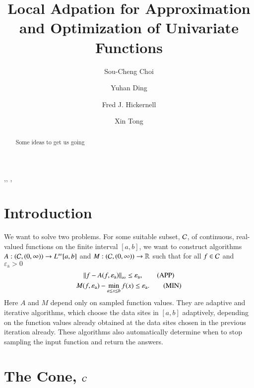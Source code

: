 \documentclass[review]{elsarticle}
\newcommand{\abstol}{\varepsilon_{\textrm{a}}}
\theoremstyle{definition}
\begin{document}
\begin{frontmatter}

\title{Local Adpation for Approximation and Optimization of Univariate Functions}


\author{Sou-Cheng Choi}
\author{Yuhan Ding}
\author{Fred J. Hickernell}
\author{Xin Tong}
\address{Department of Applied Mathematics, Illinois Institute of Technology, RE 208, 10 West 32$^{\text{nd}}$ Street, Chicago, Illinois, 60616, USA}

\begin{abstract}
Some ideas to get us going
\end{abstract}

\begin{keyword}
\sep \sep
\MSC[2010]  \sep
\end{keyword}

\end{frontmatter}

\section{Introduction} \label{sec:intro}

We want to solve two problems. For some suitable subset, $\mathcal{C}$, of continuous,
real-valued functions on the finite interval $[a,b]$, we want to construct
algorithms $A:(\mathcal{C},(0,\infty)) \to L^{\infty}[a,b]$ and $M: (\mathcal{C},(0,\infty)) \to
\mathbb{R}$ such that for all $f \in \mathcal{C}$ and $\abstol > 0$
\begin{gather}
\norm[\infty]{f - A(f,\abstol)} \le \abstol,  \tag{APP} \label{appxprob} \\
M(f,\abstol) - \min_{a \le x \le b} f(x)  \le \abstol. \tag{MIN} \label{optprob}
\end{gather}
Here $A$ and $M$ depend only on sampled function values. They are adaptive and iterative
algorithms, which choose the data sites in $[a,b]$ adaptively, depending on the
function values already obtained at the data sites chosen in the previous iteration already. These
algorithms also automatically determine when to stop sampling the input function
and return the answers.



\section{The Cone, $\mathcal{C}$} \label{sec:cone}
\end{document}
